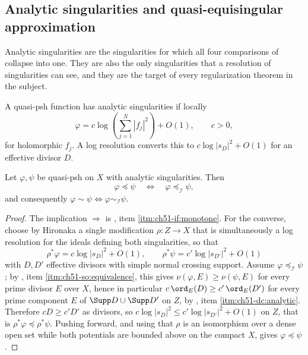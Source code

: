 \subsection{Analytic singularities and quasi-equisingular approximation}
\label{sec:ch51-analytic-sing}

Analytic singularities are the singularities for which all four
comparisons of  collapse into one.  They are also the
only singularities that a resolution of singularities can see, and they
are the target of every regularization theorem in the subject.

\begin{definition}
\label{def:complex-analytic-singularities}
A quasi-psh function has analytic singularities if locally
\[
 \varphi=c\log\!\left(\sum_{j=1}^N|f_j|^2\right)+O(1),
 \qquad c>0,
\tag{51.13}\label{eq:complex-analytic-singularities}
\]
for holomorphic \(f_j\).  A log resolution converts this to
\(c\log|s_D|^2+O(1)\) for an effective divisor \(D\).
\end{definition}

\begin{proposition}
\label{prop:ch51-analytic-rigid}
Let \(\varphi,\psi\) be quasi-psh on \(X\) with analytic singularities.
Then
\[
 \varphi\preceq\psi
 \quad\Longleftrightarrow\quad
 \varphi\preceq_{\mathcal I}\psi ,
\]
and consequently \(\varphi\sim\psi\iff\varphi\sim_{\mathcal I}\psi\).
\end{proposition}

\begin{proof}
The implication \(\Rightarrow\) is
, item \cref{itm:ch51-if:monotone}.  For the
converse, choose by Hironaka a single modification
\(\rho:Z\to X\) that is simultaneously a log resolution for the ideals
defining both singularities, so that
\[
 \rho^*\varphi=c\log|s_D|^2+O(1),
 \qquad
 \rho^*\psi=c'\log|s_{D'}|^2+O(1)
\]
with \(D,D'\) effective divisors with simple normal crossing support.
Assume \(\varphi\preceq_{\mathcal I}\psi\); by
, item \cref{itm:ch51-so:equivalence},
this gives \(\nu(\varphi,E)\geq\nu(\psi,E)\) for every prime divisor
\(E\) over \(X\), hence in particular
\(c\,\ord_E(D)\geq c'\,\ord_E(D')\) for every prime component \(E\) of
\(\Supp D\cup\Supp D'\) on \(Z\), by
, item \cref{itm:ch51-dc:analytic}.
Therefore \(cD\geq c'D'\) as divisors, so
\(c\log|s_D|^2\leq c'\log|s_{D'}|^2+O(1)\) on \(Z\), that is
\(\rho^*\varphi\preceq\rho^*\psi\).  Pushing forward, and using that
\(\rho\) is an isomorphism over a dense open set while both potentials
are bounded above on the compact \(X\), gives \(\varphi\preceq\psi\).
\end{proof}

